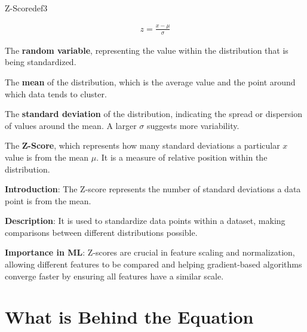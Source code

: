 \documentclass[
  12 pt,
  a4paper,
]{book}
\numberwithin{equation}{section}
\theoremstyle{plain}      %
\theoremstyle{definition} %
\theoremstyle{remark}     %
\theoremstyle{note}         %
\begin{document}
\newpage

\vspace*{\fill}

\begin{a_def_eq}{Z-Score}{def3} 

\begin{align}
z = \frac{x - \mu}{\sigma}
\end{align}

\begin{description}[align=left, labelwidth=2cm, labelsep=0em, leftmargin=2cm]
    \item[$x$] The \textbf{random variable}, representing the value within the distribution that is being standardized.
    \vspace{0.5\baselineskip}
    \item[$\mu$] The \textbf{mean} of the distribution, which is the average value and the point around which data tends to cluster.
    \vspace{0.5\baselineskip}
    \item[$\sigma$] The \textbf{standard deviation} of the distribution, indicating the spread or dispersion of values around the mean. A larger $\sigma$ suggests more variability.
    \vspace{0.5\baselineskip}
    \item[$z$] The \textbf{Z-Score}, which represents how many standard deviations a particular $x$ value is from the mean $\mu$. It is a measure of relative position within the distribution.
\end{description}

\end{a_def_eq}

\hfill\break

\textbf{Introduction}: The Z-score represents the number of standard
deviations a data point is from the mean.

\textbf{Description}: It is used to standardize data points within a
dataset, making comparisons between different distributions possible.

\textbf{Importance in ML}: Z-scores are crucial in feature scaling and
normalization, allowing different features to be compared and helping
gradient-based algorithms converge faster by ensuring all features have
a similar scale.

\vspace*{\fill}

\newpage

\hypertarget{what-is-behind-the-equation-2}{%
\section{What is Behind the
Equation}\label{what-is-behind-the-equation-2}}
\end{document}
